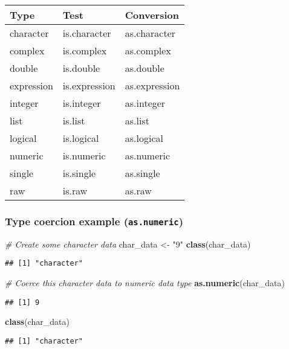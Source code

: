 \documentclass[]{article}
\newenvironment{Shaded}{\begin{snugshade}}{\end{snugshade}}
\newcommand{\KeywordTok}[1]{\textcolor[rgb]{0.13,0.29,0.53}{\textbf{#1}}}
\newcommand{\StringTok}[1]{\textcolor[rgb]{0.31,0.60,0.02}{#1}}
\newcommand{\CommentTok}[1]{\textcolor[rgb]{0.56,0.35,0.01}{\textit{#1}}}
\newcommand{\NormalTok}[1]{#1}
\begin{document}
\begin{longtable}[]{@{}lll@{}}
\toprule
Type & Test & Conversion\tabularnewline
\midrule
\endhead
character & is.character & as.character\tabularnewline
complex & is.complex & as.complex\tabularnewline
double & is.double & as.double\tabularnewline
expression & is.expression & as.expression\tabularnewline
integer & is.integer & as.integer\tabularnewline
list & is.list & as.list\tabularnewline
logical & is.logical & as.logical\tabularnewline
numeric & is.numeric & as.numeric\tabularnewline
single & is.single & as.single\tabularnewline
raw & is.raw & as.raw\tabularnewline
\bottomrule
\end{longtable}

\subsubsection{\texorpdfstring{Type coercion example
(\texttt{as.numeric})}{Type coercion example (as.numeric)}}\label{type-coercion-example-as.numeric}

\begin{Shaded}
\begin{Highlighting}[]
\CommentTok{# Create some character data}
\NormalTok{char_data <-}\StringTok{ "9"}
\KeywordTok{class}\NormalTok{(char_data)}
\end{Highlighting}
\end{Shaded}

\begin{verbatim}
## [1] "character"
\end{verbatim}

\begin{Shaded}
\begin{Highlighting}[]
\CommentTok{# Coerce this character data to numeric data type}
\KeywordTok{as.numeric}\NormalTok{(char_data)}
\end{Highlighting}
\end{Shaded}

\begin{verbatim}
## [1] 9
\end{verbatim}

\begin{Shaded}
\begin{Highlighting}[]
\KeywordTok{class}\NormalTok{(char_data)}
\end{Highlighting}
\end{Shaded}

\begin{verbatim}
## [1] "character"
\end{verbatim}
\end{document}
